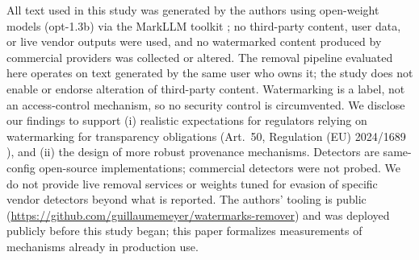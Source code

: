 
All text used in this study was generated by the authors using
open-weight models (opt-1.3b) via the MarkLLM toolkit
\citep{pan2024markllm}; no third-party content, user data, or live
vendor outputs were used, and no watermarked content produced by
commercial providers was collected or altered. The removal pipeline
evaluated here operates on text generated by the same user who owns it;
the study does not enable or endorse alteration of third-party content.
Watermarking is a label, not an access-control mechanism, so no
security control is circumvented. We disclose our findings to support
(i) realistic expectations for regulators relying on watermarking for
transparency obligations (Art.~50, Regulation (EU) 2024/1689
\citep{euaiact2024}), and (ii) the design of more robust provenance
mechanisms. Detectors are same-config open-source implementations;
commercial detectors were not probed. We do not provide live removal
services or weights tuned for evasion of specific vendor detectors
beyond what is reported. The authors' tooling is public
(\url{https://github.com/guillaumemeyer/watermarks-remover}) and was
deployed publicly before this study began; this paper formalizes
measurements of mechanisms already in production use.

